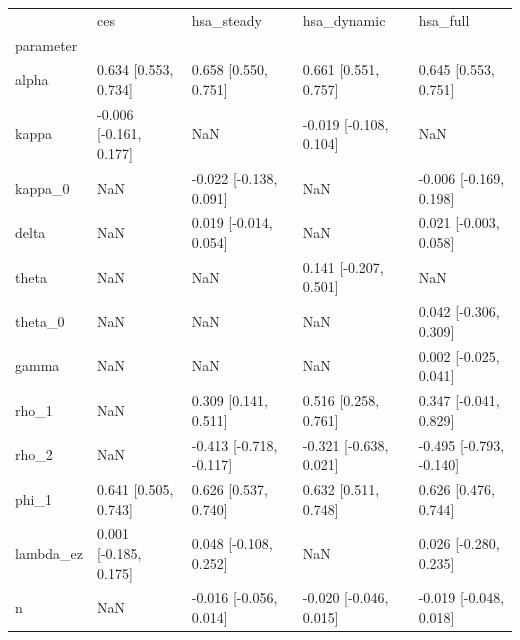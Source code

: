 \begin{tabular}{lllll}
\toprule
 & ces & hsa\_steady & hsa\_dynamic & hsa\_full \\
parameter &  &  &  &  \\
\midrule
alpha & 0.634 [0.553, 0.734] & 0.658 [0.550, 0.751] & 0.661 [0.551, 0.757] & 0.645 [0.553, 0.751] \\
kappa & -0.006 [-0.161, 0.177] & NaN & -0.019 [-0.108, 0.104] & NaN \\
kappa\_0 & NaN & -0.022 [-0.138, 0.091] & NaN & -0.006 [-0.169, 0.198] \\
delta & NaN & 0.019 [-0.014, 0.054] & NaN & 0.021 [-0.003, 0.058] \\
theta & NaN & NaN & 0.141 [-0.207, 0.501] & NaN \\
theta\_0 & NaN & NaN & NaN & 0.042 [-0.306, 0.309] \\
gamma & NaN & NaN & NaN & 0.002 [-0.025, 0.041] \\
rho\_1 & NaN & 0.309 [0.141, 0.511] & 0.516 [0.258, 0.761] & 0.347 [-0.041, 0.829] \\
rho\_2 & NaN & -0.413 [-0.718, -0.117] & -0.321 [-0.638, 0.021] & -0.495 [-0.793, -0.140] \\
phi\_1 & 0.641 [0.505, 0.743] & 0.626 [0.537, 0.740] & 0.632 [0.511, 0.748] & 0.626 [0.476, 0.744] \\
lambda\_ez & 0.001 [-0.185, 0.175] & 0.048 [-0.108, 0.252] & NaN & 0.026 [-0.280, 0.235] \\
n & NaN & -0.016 [-0.056, 0.014] & -0.020 [-0.046, 0.015] & -0.019 [-0.048, 0.018] \\
\bottomrule
\end{tabular}
